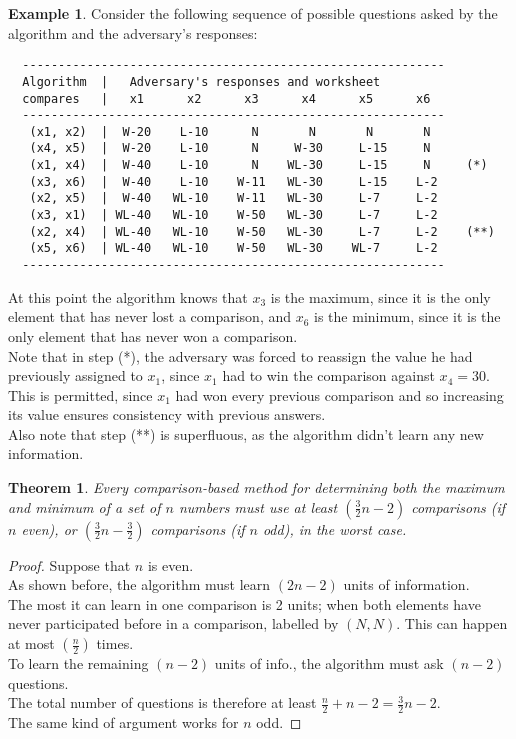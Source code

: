 \documentclass[12pt]{article}
\theoremstyle{plain}
\newtheorem{theorem}{Theorem}[subsection]
\theoremstyle{definition}
\newtheorem*{ex*}{Example}
\begin{document}
\begin{ex*}
Consider the following sequence of possible questions asked by the algorithm and the adversary's responses:
\begin{verbatim}
  -----------------------------------------------------------
  Algorithm  |   Adversary's responses and worksheet
  compares   |   x1      x2      x3      x4      x5      x6
  -----------------------------------------------------------
   (x1, x2)  |  W-20    L-10      N       N       N       N
   (x4, x5)  |  W-20    L-10      N     W-30     L-15     N
   (x1, x4)  |  W-40    L-10      N    WL-30     L-15     N     (*)
   (x3, x6)  |  W-40    L-10    W-11   WL-30     L-15    L-2
   (x2, x5)  |  W-40   WL-10    W-11   WL-30     L-7     L-2
   (x3, x1)  | WL-40   WL-10    W-50   WL-30     L-7     L-2
   (x2, x4)  | WL-40   WL-10    W-50   WL-30     L-7     L-2    (**)
   (x5, x6)  | WL-40   WL-10    W-50   WL-30    WL-7     L-2
  -----------------------------------------------------------
\end{verbatim}
At this point the algorithm knows that $x_3$ is the maximum, since it is the only element that has never lost a comparison, and $x_6$ is the minimum, since it is the only element that has never won a comparison. \\
Note that in step (*), the adversary was forced to reassign the value he had previously assigned to $x_1$, since $x_1$ had to win the comparison against $x_4 = 30$. \\
This is permitted, since $x_1$ had won every previous comparison and so increasing its value ensures consistency with previous answers. \\
Also note that step (**) is superfluous, as the algorithm didn't learn any new information.
\end{ex*}

\begin{theorem}
Every \emph{comparison-based} method for determining both the maximum and minimum of a set of $n$ numbers must use at least $(\frac{3}{2}n - 2)$ comparisons (if $n$ even), or $(\frac{3}{2}n - \frac{3}{2})$ comparisons (if $n$ odd), in the worst case.
\end{theorem}
\begin{proof}
Suppose that $n$ is even. \\
As shown before, the algorithm must learn $(2n - 2)$ units of information. \\
The most it can learn in one comparison is 2 units;
when both elements have never participated before in a comparison, labelled by $(N, N)$.
This can happen at most $(\frac{n}{2})$ times. \\
To learn the remaining $(n - 2)$ units of info., the algorithm must ask $(n - 2)$ questions. \\
The total number of questions is therefore at least $\frac{n}{2} + n - 2 = \frac{3}{2}n - 2$. \\
The same kind of argument works for $n$ odd.
\end{proof}
\end{document}
